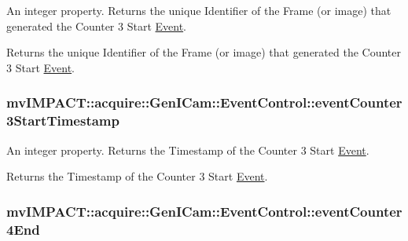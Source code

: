 An integer property. Returns the unique Identifier of the Frame (or image) that generated the Counter 3 Start \hyperlink{classmv_i_m_p_a_c_t_1_1acquire_1_1_event}{Event}. 

Returns the unique Identifier of the Frame (or image) that generated the Counter 3 Start \hyperlink{classmv_i_m_p_a_c_t_1_1acquire_1_1_event}{Event}. \hypertarget{classmv_i_m_p_a_c_t_1_1acquire_1_1_gen_i_cam_1_1_event_control_a0184c5f30ec97c81af9af1f4a494a7f0}{
\subsubsection[{event\+Counter3\+Start\+Timestamp}]{ mv\+I\+M\+P\+A\+C\+T\+::acquire\+::\+Gen\+I\+Cam\+::\+Event\+Control\+::event\+Counter3\+Start\+Timestamp}}\label{classmv_i_m_p_a_c_t_1_1acquire_1_1_gen_i_cam_1_1_event_control_a0184c5f30ec97c81af9af1f4a494a7f0}


An integer property. Returns the Timestamp of the Counter 3 Start \hyperlink{classmv_i_m_p_a_c_t_1_1acquire_1_1_event}{Event}. 

Returns the Timestamp of the Counter 3 Start \hyperlink{classmv_i_m_p_a_c_t_1_1acquire_1_1_event}{Event}. \hypertarget{classmv_i_m_p_a_c_t_1_1acquire_1_1_gen_i_cam_1_1_event_control_aae8e7390b8248d77357aabc29ff52c6f}{
\subsubsection[{event\+Counter4\+End}]{ mv\+I\+M\+P\+A\+C\+T\+::acquire\+::\+Gen\+I\+Cam\+::\+Event\+Control\+::event\+Counter4\+End}}\label{classmv_i_m_p_a_c_t_1_1acquire_1_1_gen_i_cam_1_1_event_control_aae8e7390b8248d77357aabc29ff52c6f}



